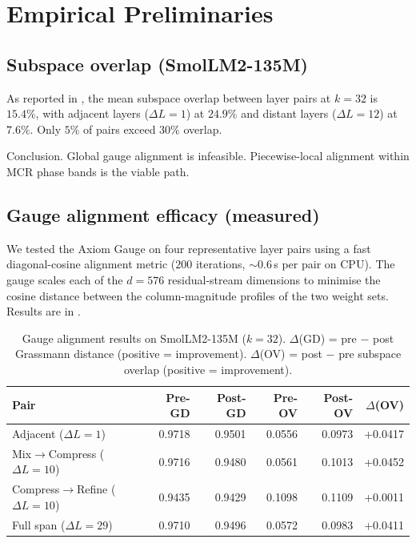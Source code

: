 \documentclass[11pt]{article}
\begin{document}
\section{Empirical Preliminaries}
\label{sec:empirical}

\subsection{Subspace overlap (SmolLM2-135M)}

As reported in , the mean subspace overlap
between layer pairs at $k{=}32$ is $15.4\%$, with adjacent layers
($\Delta L{=}1$) at $24.9\%$ and distant layers ($\Delta L{=}12$)
at $7.6\%$.  Only $5\%$ of pairs exceed $30\%$ overlap.

Conclusion.  Global gauge alignment is infeasible.
Piecewise-local alignment within MCR phase bands is the viable path.

\subsection{Gauge alignment efficacy (measured)}

We tested the Axiom Gauge on four representative layer pairs using
a fast diagonal-cosine alignment metric ($200$ iterations, ${\sim}0.6$\,s
per pair on CPU).  The gauge scales each of the $d{=}576$ residual-stream
dimensions to minimise the cosine distance between the column-magnitude
profiles of the two weight sets.  Results are in .

\begin{table}[h]\centering\small
\caption{Gauge alignment results on SmolLM2-135M ($k{=}32$).
$\Delta$(GD) = pre $-$ post Grassmann distance (positive = improvement).
$\Delta$(OV) = post $-$ pre subspace overlap (positive = improvement).}
\label{tab:gauge-align}
\begin{tabular}{@{}lrrrrr@{}}
\toprule
Pair & Pre-GD & Post-GD & Pre-OV & Post-OV & $\Delta$(OV) \\
\midrule
Adjacent ($\Delta L{=}1$)     & 0.9718 & 0.9501 & 0.0556 & 0.0973 & +0.0417 \\
Mix$\to$Compress ($\Delta L{=}10$) & 0.9716 & 0.9480 & 0.0561 & 0.1013 & +0.0452 \\
Compress$\to$Refine ($\Delta L{=}10$) & 0.9435 & 0.9429 & 0.1098 & 0.1109 & +0.0011 \\
Full span ($\Delta L{=}29$)  & 0.9710 & 0.9496 & 0.0572 & 0.0983 & +0.0411 \\
\bottomrule
\end{tabular}
\end{table}
\end{document}
